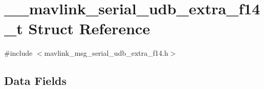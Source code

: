 \hypertarget{struct____mavlink__serial__udb__extra__f14__t}{\section{\+\_\+\+\_\+mavlink\+\_\+serial\+\_\+udb\+\_\+extra\+\_\+f14\+\_\+t Struct Reference}
\label{struct____mavlink__serial__udb__extra__f14__t}
}


{\ttfamily \#include $<$mavlink\+\_\+msg\+\_\+serial\+\_\+udb\+\_\+extra\+\_\+f14.\+h$>$}

\subsection*{Data Fields}
